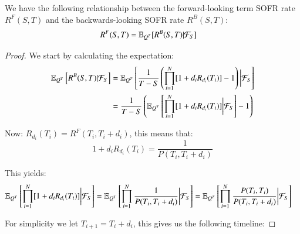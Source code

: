 \begin{proposition}
We have the following relationship between the forward-looking term SOFR rate $R^{F}(S,T)$ and the backwards-looking SOFR rate $R^{B}(S,T)$: 
\begin{align*}
R^{F}(S,T) &= \mathbb{E}_{Q^{T}}[R^{B}(S,T)|\mathcal{F}_{S}]    
\end{align*}
\end{proposition}

\begin{proof}

We start by calculating the expectation: 
\begin{align}
\label{eq: QT_expectation_R_Backwards}
\mathbb{E}_{Q^{T}}\left[
R^{B}(S,T)|\mathcal{F}_{S}
\right]
&= 
\mathbb{E}_{Q^{T}}\left[
\frac{1}{T-S}\left(
\prod_{i=1}^{N}[1+d_{i}R_{d_{i}}(T_{i})] - 1
\right)
\bigg{|}\mathcal{F}_{S}
\right] \nonumber \\ 
&= 
\frac{1}{T-S}
\left(\mathbb{E}_{Q^{T}}\left[
\prod_{i=1}^{N}[1+d_{i}R_{d_{i}}(T_{i})]\bigg{|}\mathcal{F}_{S} 
\right] - 1
\right)
\end{align}

Now: $R_{d_{i}}(T_{i}) = R^{F}(T_{i}, T_{i}+d_{i})$, this means that: 
\[
1 + d_{i}R_{d_{i}}(T_{i}) = \frac{1}{P(T_{i}, T_{i} + d_{i})}
\]

This yields:
\begin{align*}
\mathbb{E}_{Q^{T}}\left[
\prod_{i=1}^{N}[1+d_{i}R_{d_{i}}(T_{i})]\bigg{|}\mathcal{F}_{S} 
\right]
&= 
\mathbb{E}_{Q^{T}}\left[
\prod_{i=1}^{N}\frac{
1
}{
P(T_{i}, T_{i} + d_{i})
}
\bigg{|}\mathcal{F}_{S}
\right]
= 
\mathbb{E}_{Q^{T}}\left[
\prod_{i=1}^{N}\frac{
P(T_{i}, T_{i})
}{
P(T_{i}, T_{i} + d_{i})
}
\bigg{|}\mathcal{F}_{S}
\right]
\end{align*}

For simplicity we let $T_{i+1} = T_{i} + d_{i}$, this gives us the following timeline:





\end{proof}
